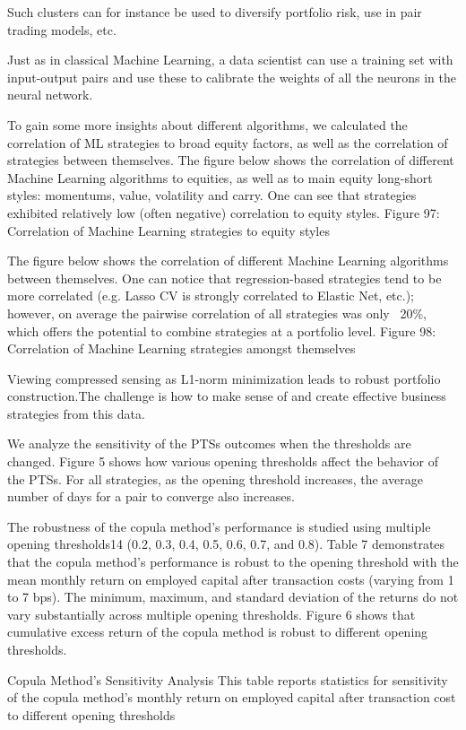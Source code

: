 \documentclass[a4paper]{article}
\begin{document}
Such
clusters can for instance be used to diversify portfolio risk, use in pair trading models, etc.

Just as in classical Machine Learning, a data scientist can use a training set with input-output pairs and use
these to calibrate the weights of all the neurons in the neural network.

To gain some more insights about different algorithms, we calculated the correlation of ML strategies to broad equity
factors, as well as the correlation of strategies between themselves. The figure below shows the correlation of different
Machine Learning algorithms to equities, as well as to main equity long-short styles: momentums, value, volatility and
carry. One can see that strategies exhibited relatively low (often negative) correlation to equity styles.
Figure 97: Correlation of Machine Learning strategies to equity styles

The figure below shows the correlation of different Machine Learning algorithms between themselves. One can notice that
regression-based strategies tend to be more correlated (e.g. Lasso CV is strongly correlated to Elastic Net, etc.); however, on
average the pairwise correlation of all strategies was only ~20\%, which offers the potential to combine strategies at a
portfolio level.
Figure 98: Correlation of Machine Learning strategies amongst themselves

Viewing compressed sensing as L1-norm minimization leads to robust
portfolio construction.The challenge is how to make sense of and create effective
business strategies from this data.

We analyze the sensitivity of the PTSs
outcomes when the thresholds are changed. Figure 5 shows how various opening thresholds affect
the behavior of the PTSs. For all strategies, as the opening threshold increases, the average number
of days for a pair to converge also increases. 

The robustness of the copula method’s performance is studied using multiple opening thresholds14
(0.2, 0.3, 0.4, 0.5, 0.6, 0.7, and 0.8). Table 7 demonstrates that the copula method’s performance
is robust to the opening threshold with the mean monthly return on employed capital after
transaction costs (varying from 1 to 7 bps). The minimum, maximum, and standard deviation
of the returns do not vary substantially across multiple opening thresholds. Figure 6 shows that
cumulative excess return of the copula method is robust to different opening thresholds.

Copula Method’s Sensitivity Analysis
This table reports statistics for sensitivity of the copula method’s monthly return on employed capital after transaction
cost to different opening thresholds
\end{document}
